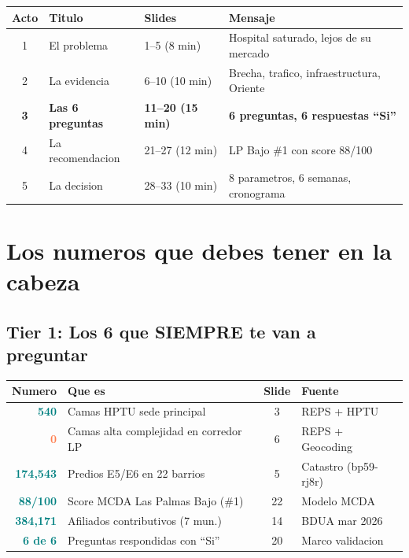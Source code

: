 \documentclass[11pt, a4paper]{article}
\newcommand{\hl}[1]{\textcolor{teal}{\textbf{#1}}}
\newcommand{\dg}[1]{\textcolor{coral}{\textbf{#1}}}
\begin{document}
\vspace{6pt}

\begin{tabular}{@{}clll@{}}
\toprule
\textbf{Acto} & \textbf{Titulo} & \textbf{Slides} & \textbf{Mensaje} \\
\midrule
\rowcolor{bgcrit}
1 & El problema & 1--5 (8 min) & Hospital saturado, lejos de su mercado \\
2 & La evidencia & 6--10 (10 min) & Brecha, trafico, infraestructura, Oriente \\
\rowcolor{bgtip}
\textbf{3} & \textbf{Las 6 preguntas} & \textbf{11--20 (15 min)} & \textbf{6 preguntas, 6 respuestas ``Si''} \\
4 & La recomendacion & 21--27 (12 min) & LP Bajo \#1 con score 88/100 \\
\rowcolor{bglight}
5 & La decision & 28--33 (10 min) & 8 parametros, 6 semanas, cronograma \\
\bottomrule
\end{tabular}


\section{Los numeros que debes tener en la cabeza}

\subsection{Tier 1: Los 6 que SIEMPRE te van a preguntar}

\renewcommand{\arraystretch}{1.35}
\begin{tabular}{@{}rp{7cm}cl@{}}
\toprule
\textbf{Numero} & \textbf{Que es} & \textbf{Slide} & \textbf{Fuente} \\
\midrule
\rowcolor{bgcrit}
\hl{540} & Camas HPTU sede principal & 3 & REPS + HPTU \\
\rowcolor{bgcrit}
\dg{0} & Camas alta complejidad en corredor LP & 6 & REPS + Geocoding \\
\rowcolor{bglight}
\hl{174,543} & Predios E5/E6 en 22 barrios & 5 & Catastro (bp59-rj8r) \\
\rowcolor{bgtip}
\hl{88/100} & Score MCDA Las Palmas Bajo (\#1) & 22 & Modelo MCDA \\
\rowcolor{bglight}
\hl{384,171} & Afiliados contributivos (7 mun.) & 14 & BDUA mar 2026 \\
\rowcolor{bgtip}
\hl{6 de 6} & Preguntas respondidas con ``Si'' & 20 & Marco validacion \\
\bottomrule
\end{tabular}
\end{document}
